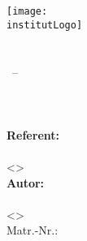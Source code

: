 
\begin{titlepage}

  \begin{center}
    \sffamily

    \texttt{[image: \\institutLogo]}\\[4ex]

    \huge{\institutName}\\[1ex]
    \LARGE{\fakultaet}\\[1ex]
    \Large{\studiengang\ --\ \studiengangKuerzel}\\[50pt]

    \huge{\textbf{\titel}}\\[3ex]
    \Large{\textbf{\untertitel}}\\[1ex]
    \Large{\untertitelEnglisch}\\[50pt]

    \large
    \textbf{Referent:}\\
    \\
    <>\\[3ex]

    \textbf{Autor:}\\
    \autorName\\
    <\autorEmail>\\
    Matr.-Nr.: \autorMatnr\\[50pt]

    \zeitstempel

    \rmfamily
  \end{center}

\end{titlepage}
